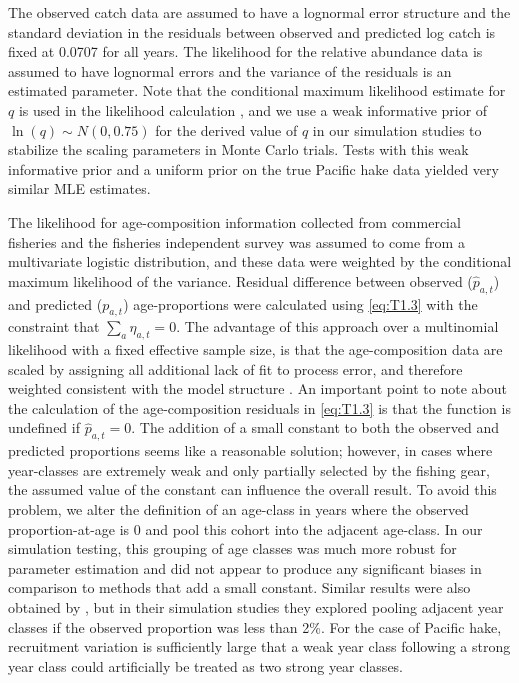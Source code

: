 The observed catch data are assumed to have a lognormal error structure and the standard deviation in the residuals between observed and predicted log catch is fixed at 0.0707 for all years. The likelihood for the relative abundance data is assumed to have lognormal errors and the variance of the residuals is an estimated parameter.  Note that the conditional maximum likelihood estimate for $q$ is used in the likelihood calculation \citep{walters1994calculation}, and we use a weak informative prior of $\ln(q) \sim N(0,0.75)$ for the derived value of $q$ in our simulation studies to stabilize the scaling parameters in Monte Carlo trials.  Tests with this weak informative prior and a uniform prior on the true Pacific hake data yielded very similar MLE estimates.

The likelihood for age-composition information collected from commercial fisheries and the fisheries independent survey was assumed to come from a  multivariate logistic distribution, and these data were weighted by the conditional maximum likelihood of the variance.  Residual difference between observed ($\hat{p}_{a,t}$) and predicted ($p_{a,t}$) age-proportions were calculated using \eqref{eq:T1.3} with the constraint that $\sum_a \eta_{a,t} = 0$.  The advantage of this approach over a multinomial likelihood with a fixed effective sample size, is that the age-composition data are scaled by assigning all additional lack of fit to process error, and therefore weighted consistent with the model structure \citep{schnute1995influence}. An important point to note about the calculation of the age-composition residuals in \eqref{eq:T1.3} is that the function is undefined if $\hat{p}_{a,t}=0$.  The addition of a small constant to both the observed and predicted proportions seems like a reasonable solution; however, in cases where year-classes are extremely weak and only partially selected by the fishing gear, the assumed value of the constant can influence the overall result.  To avoid this problem, we alter the definition of an age-class in years where the observed proportion-at-age is 0 and pool this cohort into the adjacent age-class.  In our simulation testing, this grouping of age classes was much more robust for parameter estimation and did not appear to produce any significant biases in comparison to methods that add a small constant.  Similar results were also obtained by \cite{richards1997visualizing}, but in their simulation studies they explored pooling adjacent year classes if the observed proportion was less than 2\%.  For the case of Pacific hake, recruitment variation is sufficiently large that a weak year class following a strong year class could artificially be treated as two strong year classes. 

